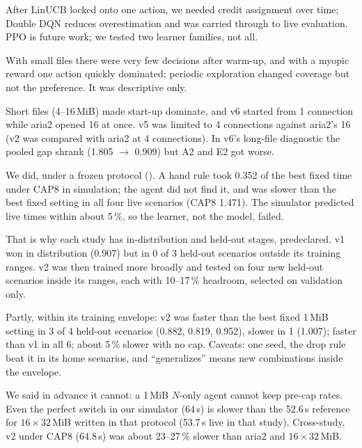 \A After LinUCB locked onto one action, we needed credit assignment over time; Double DQN reduces overestimation and was carried through to live evaluation. PPO is future work; we tested two learner families, not all.

\A With small files there were very few decisions after warm-up, and with a myopic reward one action quickly dominated; periodic exploration changed coverage but not the preference. It was descriptive only.

\A Short files (4--16\,MiB) made start-up dominate, and v6 started from 1 connection while aria2 opened 16 at once. v5 was limited to 4 connections against aria2's 16 (v2 was compared with aria2 at 4 connections). In v6's long-file diagnostic the pooled gap shrank (1.805 $\to$ 0.909) but A2 and E2 got worse.

\A We did, under a frozen protocol (). A hand rule took 0.352 of the best fixed time under CAP8 in simulation; the agent did not find it, and was slower than the best fixed setting in all four live scenarios (CAP8 1.471). The simulator predicted live times within about 5\,\%, so the learner, not the model, failed.

\A That is why each study has in-distribution and held-out stages, predeclared. v1 won in distribution (0.907) but in 0 of 3 held-out scenarios outside its training ranges. v2 was then trained more broadly and tested on four new held-out scenarios inside its ranges, each with 10--17\,\% headroom, selected on validation only.

\A Partly, within its training envelope: v2 was faster than the best fixed 1\,MiB setting in 3 of 4 held-out scenarios (0.882, 0.819, 0.952), slower in 1 (1.007); faster than v1 in all 6; about 5\,\% slower with no cap. Caveats: one seed, the drop rule beat it in its home scenarios, and ``generalizes'' means new combinations inside the envelope.

\A We said in advance it cannot: a 1\,MiB $N$-only agent cannot keep pre-cap rates. Even the perfect switch in our simulator (64\,s) is slower than the 52.6\,s reference for $16\times32$\,MiB written in that protocol (53.7\,s live in that study). Cross-study, v2 under CAP8 (64.8\,s) was about 23--27\,\% slower than aria2 and $16\times32$\,MiB.

